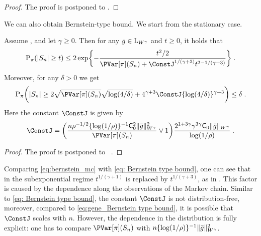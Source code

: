 \documentclass[sn-mathphys,Numbered]{sn-jnl}%
\begin{document}
\begin{proof}
  The proof is postponed to .
\end{proof}
We can also obtain Bernstein-type bound. We start from the stationary case.
\begin{theorem}
\label{th:rosenthal_log_V_cor_2}
Assume ,  and let $\gamma \geq 0$. Then for any $g \in \mrl_{W^\gamma}$ and $t \geq 0$, it holds that 
\begin{equation}
\label{eq:bernstein_mc}
\PP_{\pi}(|S_n| \geq t) \leq 2\exp\biggl\{-\frac{t^2/2}{\PVar[\pi](S_n) + \ConstJ^{1/(\gamma+3)} t^{2-1/(\gamma+3)}}\biggr\}\eqsp.
\end{equation}
Moreover, for any $\delta > 0$ we get
\begin{equation}
\label{eq:high_prob_bound_W_ergodic}
\PP_{\pi}\biggl(|S_n| \geq 2\sqrt{\PVar[\pi](S_n)}\sqrt{\log(4/\delta)} + 4^{\gamma+3}\ConstJ\{\log(4/\delta)\}^{\gamma+3}\biggr) \leq \delta\eqsp.
\end{equation}
Here the constant $\ConstJ$ is given by
\begin{equation}
\label{eq:const_B_n_definition_main}
\ConstJ = \biggl( \frac{n \ratev^{-1/2} \{\log(1/\ratev)\}^{-1} \Constmainros^{2} \|\bar{g}\|_{W^{\gamma}}^{2}}{\PVar[\pi](S_n)} \vee 1\biggr) \frac{ 2^{1+3\gamma}\gamma^{3\gamma} \Constmainros \|\bar{g}\|_{W^{\gamma}}}{\log(1/\ratev)} \eqsp.
\end{equation}
\end{theorem}
\begin{proof}
The proof is postponed to ~.
\end{proof}
Comparing \eqref{eq:bernstein_mc} with \eqref{eq: Bernstein type bound}, one can see that in the subexponential regime $t^{1/(\gamma+1)}$ is replaced by $t^{1/(\gamma+3)}$, as in \cite{doukhan2007probability}. This factor is caused by the dependence along the observations of the Markov chain. Similar to \eqref{eq: Bernstein type bound}, the constant $\ConstJ$ is not distribution-free, moreover, compared to \eqref{eq:gene_Bernstein type bound}, it is possible that $\ConstJ$ scales with $n$. However, the dependence in the distribution is fully explicit: one has to compare $\PVar[\pi](S_n)$ with $n \{\log(1/\ratev)\}^{-1} \Vnorm[W^\gamma]{\bar{g}}^{2}$.
\end{document}
